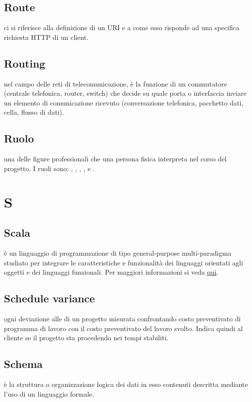 \documentclass[12pt,a4paper]{article}
\begin{document}
\subsection{Route} 
ci si riferisce alla definizione di un URI e a come esso risponde ad una specifica richiesta HTTP di un client.

\subsection{Routing} 
nel campo delle reti di telecomunicazione, è la funzione di un commutatore (centrale telefonica, router, switch) che decide su quale porta o interfaccia inviare un elemento di comunicazione ricevuto (conversazione telefonica, pacchetto dati, cella, flusso di dati).

\subsection{Ruolo} 
una delle figure professionali che una persona fisica interpreta nel corso del progetto. I ruoli sono: , , , ,  e .


\newpage

\section{S}


\subsection{Scala} 
è un linguaggio di programmazione di tipo general-purpose multi-paradigma studiato per integrare le caratteristiche e funzionalità dei linguaggi orientati agli oggetti e dei linguaggi funzionali. Per maggiori informazioni si veda \href{https://it.wikipedia.org/wiki/Scala_(linguaggio_di_programmazione)}{qui}.

\subsection{Schedule variance} 
ogni deviazione alle  di un progetto misurata confrontando costo preventivato di programma di lavoro con il costo preventivato del lavoro svolto. Indica quindi al cliente se il progetto sta procedendo nei tempi stabiliti.

\subsection{Schema} 
è la struttura o organizzazione logica dei dati in esso contenuti descritta mediante l'uso di un linguaggio formale.
\end{document}
